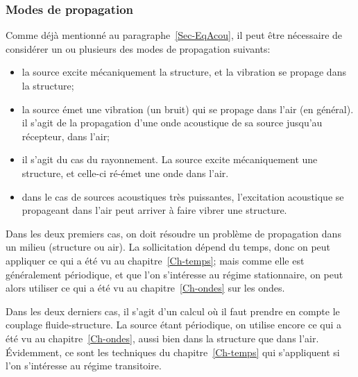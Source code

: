 \subsubsection{Modes de propagation}
Comme déjà mentionné au paragraphe~\ref{Sec-EqAcou}, il peut être nécessaire de considérer un ou plusieurs des modes de propagation suivants:
\begin{itemize}
\item {} la source excite mécaniquement la structure, et la vibration se propage dans la structure;
  \item {} la source émet une vibration (un bruit) qui se propage dans l'air (en général). il s'agit de la propagation d'une onde acoustique de sa source jusqu'au récepteur, dans l'air;
  \item {} il s'agit du cas du rayonnement. La source excite  mécaniquement une structure, et celle-ci ré-émet une onde dans l'air. 
  \item {} dans le cas de sources acoustiques très puissantes, l'excitation acoustique se propageant dans l'air peut arriver à faire vibrer une structure.
\end{itemize}
Dans les deux premiers cas, on doit résoudre un problème de propagation dans un milieu (structure ou air). La sollicitation dépend du temps, donc on peut appliquer ce qui a été vu au chapitre~\ref{Ch-temps}; mais comme elle est généralement périodique, et que l'on s'intéresse au régime stationnaire, on peut alors utiliser ce qui a été vu au chapitre~\ref{Ch-ondes} sur les ondes.

Dans les deux derniers cas, il s'agit d'un calcul où il faut prendre en compte le couplage fluide-structure. La source étant périodique, on utilise encore ce qui a été vu au chapitre~\ref{Ch-ondes}, aussi bien dans la structure que dans l'air. Évidemment, ce sont les techniques du chapitre~\ref{Ch-temps} qui s'appliquent si l'on s'intéresse au régime transitoire.

